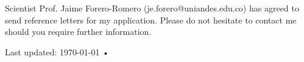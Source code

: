 \documentclass[10pt, a4paper]{article}
\begin{document}

\vspace{2.0cm}
Scientist Prof. Jaime Forero-Romero (je.forero@uniandes.edu.co) has agreed to send reference letters for my application. Please do not hesitate to contact me should you require further information.



\begin{center}
{\scriptsize  Last updated: \today\- •\- 
}
\end{center}
\end{document}

